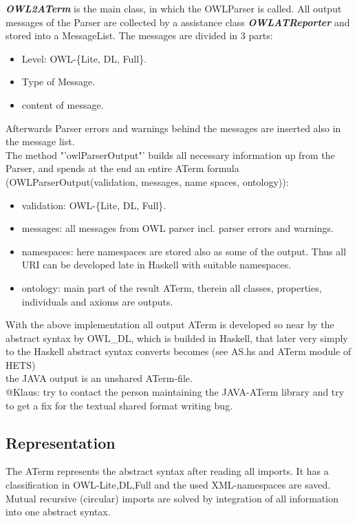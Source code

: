 \documentclass[11pt,a4paper]{article}
\begin{document}
\textbf{\emph{OWL2ATerm}} is the main class, in which the OWLParser is called.  All output messages of the Parser are collected by a assistance class \textbf{\emph{OWLATReporter}} and stored into a MessageList.  The messages are divided in 3 parts:
	\begin{itemize}
		\item Level: OWL-\{Lite, DL, Full\}.
		\item Type of Message.
		\item content of message.
	\end{itemize} 
Afterwards Parser errors and warnings behind the messages are inserted also in the message list. \\
The method "'owlParserOutput"' builds all necessary information up from the Parser, and spends at the end an entire ATerm formula (OWLParserOutput(validation, messages, name spaces, ontology)):
	\begin{itemize}
		\item validation: OWL-\{Lite, DL, Full\}.
		\item messages: all messages from OWL parser incl. parser errors and warnings.
		\item namespaces: here namespaces are stored also as some of the output. Thus all URI can be developed late in Haskell with suitable namespaces.
		\item ontology: main part of the result ATerm, therein all classes, properties, individuals and axioms are outputs.
	\end{itemize} 
   With the above implementation all output ATerm is developed so near by the abstract syntax by OWL\_DL, which is builded in Haskell, that later very simply to the Haskell abstract syntax converts becomes (see AS.hs and ATerm module of HETS)\\

   the JAVA output is an unshared ATerm-file.\\

   @Klaus: try to contact the person maintaining the JAVA-ATerm
   library and try to get a fix for the textual shared format writing
   bug. 

\subsection{Representation}
The ATerm represents the abstract syntax after reading all
   imports. It has a classification in OWL-{Lite,DL,Full} and the used
   XML-namespaces are saved. Mutual recursive (circular) imports are
   solved by integration of all information into one abstract syntax.
\end{document}
